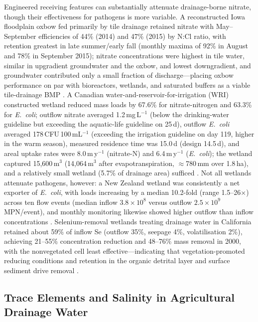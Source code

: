 Engineered receiving features can substantially attenuate drainage-borne nitrate, though their effectiveness for pathogens is more variable. A reconstructed Iowa floodplain oxbow fed primarily by tile drainage retained nitrate with May--September efficiencies of 44\% (2014) and 47\% (2015) by N:Cl ratio, with retention greatest in late summer/early fall (monthly maxima of 92\% in August and 78\% in September 2015); nitrate concentrations were highest in tile water, similar in upgradient groundwater and the oxbow, and lowest downgradient, and groundwater contributed only a small fraction of discharge---placing oxbow performance on par with bioreactors, wetlands, and saturated buffers as a viable tile-drainage BMP \parencite{Schilling2017}. A Canadian water-and-reservoir-for-irrigation (WRI) constructed wetland reduced mass loads by 67.6\% for nitrate-nitrogen and 63.3\% for \textit{E.\ coli}; outflow nitrate averaged 1.2\,mg\,L$^{-1}$ (below the drinking-water guideline but exceeding the aquatic-life guideline on 25\,d), outflow \textit{E.\ coli} averaged 178\,CFU\,100\,mL$^{-1}$ (exceeding the irrigation guideline on day 119, higher in the warm season), measured residence time was 15.0\,d (design 14.5\,d), and areal uptake rates were 8.0\,m\,y$^{-1}$ (nitrate-N) and 6.4\,m\,y$^{-1}$ (\textit{E.\ coli}); the wetland captured 15{,}600\,m$^{3}$ (14{,}064\,m$^{3}$ after evapotranspiration, $\approx$780\,mm over 1.8\,ha), and a relatively small wetland (5.7\% of drainage area) sufficed \parencite{Haverstock2017}. Not all wetlands attenuate pathogens, however: a New Zealand wetland was consistently a net exporter of \textit{E.\ coli}, with loads increasing by a median 10.2-fold (range 1.5--26$\times$) across ten flow events (median inflow $3.8\times10^{8}$ versus outflow $2.5\times10^{9}$\,MPN/event), and monthly monitoring likewise showed higher outflow than inflow concentrations \parencite{Stott2023}. Selenium-removal wetlands treating drainage water in California retained about 59\% of inflow Se (outflow 35\%, seepage 4\%, volatilisation 2\%), achieving 21--55\% concentration reduction and 48--76\% mass removal in 2000, with the nonvegetated cell least effective---indicating that vegetation-promoted reducing conditions and retention in the organic detrital layer and surface sediment drive removal \parencite{Gao2003}.

\subsection{Trace Elements and Salinity in Agricultural Drainage Water}

